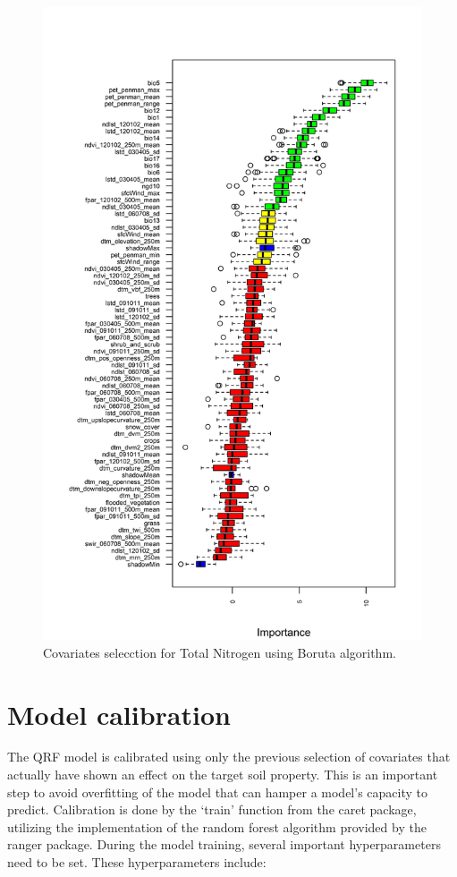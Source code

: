 \documentclass[
  10pt,
  b5paper,
  oneside]{book}
\begin{document}
\begin{figure}
\includegraphics[width=1\linewidth]{images/importance_n_0_30} \caption{Covariates selecction for Total Nitrogen using Boruta algorithm.}\label{fig:borutaplot}
\end{figure}

\hypertarget{model-calibration}{%
\section{Model calibration}\label{model-calibration}}

The QRF model is calibrated using only the previous selection of covariates that actually have shown an effect on the target soil property. This is an important step to avoid overfitting of the model that can hamper a model's capacity to predict. Calibration is done by the `train' function from the caret package, utilizing the implementation of the random forest algorithm provided by the ranger package. During the model training, several important hyperparameters need to be set. These hyperparameters include:
\end{document}
